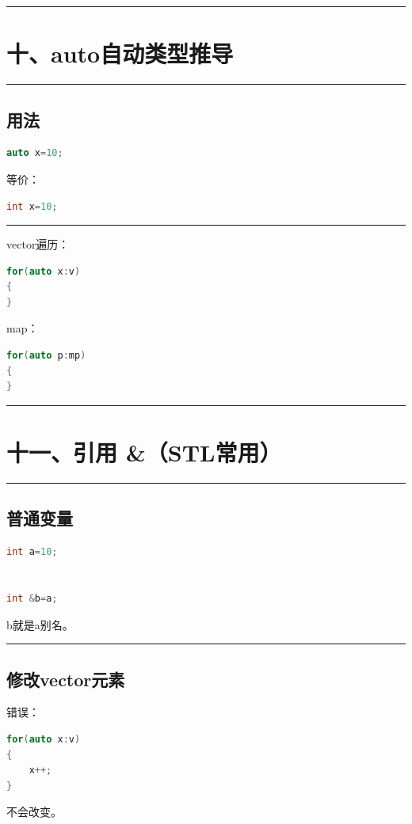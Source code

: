 \documentclass[10pt,twocolumn]{extarticle}
\begin{document}
\noindent\rule{\linewidth}{0.4pt}

\section{十、auto自动类型推导}

\noindent\rule{\linewidth}{0.4pt}

\subsection{用法}
\begin{lstlisting}[language=C++]
auto x=10;
\end{lstlisting}
等价：
\begin{lstlisting}[language=C++]
int x=10;
\end{lstlisting}

\noindent\rule{\linewidth}{0.4pt}

vector遍历：
\begin{lstlisting}[language=C++]
for(auto x:v)
{
}
\end{lstlisting}
map：
\begin{lstlisting}[language=C++]
for(auto p:mp)
{
}
\end{lstlisting}

\noindent\rule{\linewidth}{0.4pt}

\section{十一、引用 \&（STL常用）}

\noindent\rule{\linewidth}{0.4pt}

\subsection{普通变量}
\begin{lstlisting}[language=C++]
int a=10;


int &b=a;
\end{lstlisting}
b就是a别名。

\noindent\rule{\linewidth}{0.4pt}

\subsection{修改vector元素}
错误：
\begin{lstlisting}[language=C++]
for(auto x:v)
{
    x++;
}
\end{lstlisting}
不会改变。
\end{document}
